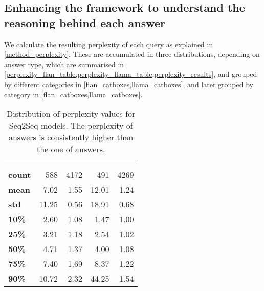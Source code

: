 \clearpage{}
\subsection{Enhancing the framework to understand the reasoning behind each answer}
\label{results_perplexity_score}

We calculate the resulting perplexity of each query as explained in \cref{method_perplexity}.
These are accumulated in three distributions, depending on answer type, which are summarised in \cref{perplexity_flan_table,perplexity_llama_table,perplexity_results}, and grouped by different categories in \cref{flan_catboxes,llama_catboxes}, and later grouped by category in \cref{flan_catboxes,llama_catboxes}.

\begin{table}[ht]
	\centering
	\scriptsize
	\begin{tabular}{>{\bfseries}l | r r | r r}
		\toprule
			& \multicolumn{2}{|c}{\smallflan} & \multicolumn{2}{|c}{\bigflan} \\
			& \Parametric{} & \Contextual{} & \Parametric{} & \Contextual{} \\
		\midrule
			count & 588 & 4172 & 491 & 4269 \\
			mean & 7.02 & 1.55 & 12.01 & 1.24 \\
			std & 11.25 & 0.56 & 18.91 & 0.68 \\
			10\% & 2.60 & 1.08 & 1.47 & 1.00 \\
			25\% & 3.21 & 1.18 & 2.54 & 1.02 \\
			50\% & 4.71 & 1.37 & 4.00 & 1.08 \\
			75\% & 7.40 & 1.69 & 8.37 & 1.22 \\
			90\% & 10.72 & 2.32 & 44.25 & 1.54 \\
		\bottomrule
	\end{tabular}
	\caption{Distribution of perplexity values for Seq2Seq models. The perplexity of \Parametric{} answers is consistently higher than the one of \Contextual{} answers.}
	\label{perplexity_flan_table}
\end{table}

